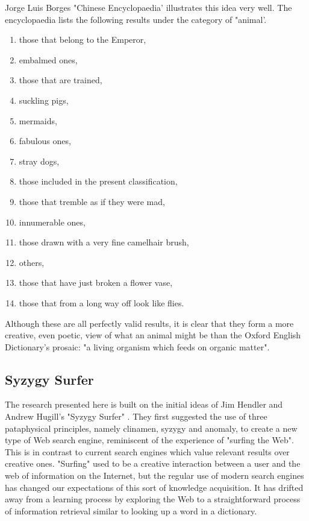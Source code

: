 Jorge Luis Borges "Chinese Encyclopaedia' \citep{Borges2000} illustrates this idea very well. The encyclopaedia lists the following results under the category of "animal'.

\begin{enumerate}
  \item those that belong to the Emperor,
  \item embalmed ones,
  \item those that are trained,
  \item suckling pigs,
  \item mermaids,
  \item fabulous ones,
  \item stray dogs,
  \item those included in the present classification,
  \item those that tremble as if they were mad,
  \item innumerable ones,
  \item those drawn with a very fine camelhair brush,
  \item others,
  \item those that have just broken a flower vase,
  \item those that from a long way off look like flies.
\end{enumerate}

Although these are all perfectly valid results, it is clear that they form a more creative, even poetic, view of what an animal might be than the Oxford English Dictionary's prosaic: "a living organism which feeds on organic matter".

\subsection{Syzygy Surfer}

The research presented here is built on the initial ideas of Jim Hendler and Andrew Hugill's "Syzygy Surfer" \citep{Hendler2011, Hendler2013}. They first suggested the use of three pataphysical principles, namely clinamen, syzygy and anomaly, to create a new type of Web search engine, reminiscent of the experience of "surfing the Web". This is in contrast to current search engines which value relevant results over creative ones. "Surfing" used to be a creative interaction between a user and the web of information on the Internet, but the regular use of modern search engines has changed our expectations of this sort of knowledge acquisition. It has drifted away from a learning process by exploring the Web to a straightforward process of information retrieval similar to looking up a word in a dictionary.

